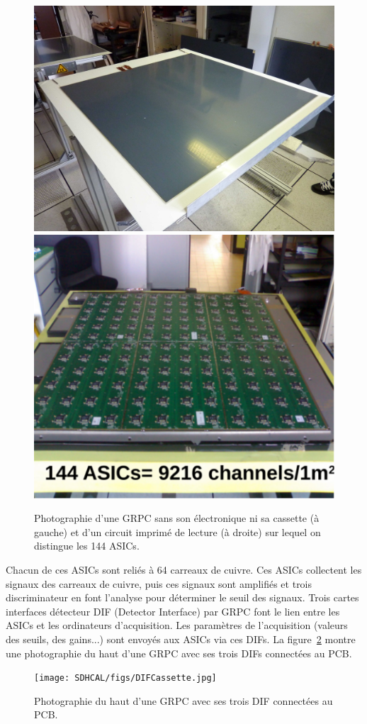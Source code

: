 \begin{figure}[!h]
  \begin{center}
    \includegraphics[width=.47\textwidth]{SDHCAL/figs/aLayer.jpg}
    \includegraphics[width=.4\textwidth]{SDHCAL/figs/layer_electronic2.pdf}
    \caption{Photographie d'une GRPC sans son électronique ni sa cassette (à gauche) et d'un circuit imprimé de lecture (à droite) sur lequel on distingue les 144 ASICs.}
    \label{fig:layer}
  \end{center}
\end{figure}
Chacun de ces ASICs sont reliés à 64 carreaux de cuivre. Ces ASICs collectent les signaux des carreaux de cuivre, puis ces signaux sont amplifiés et trois discriminateur en font l'analyse pour déterminer le seuil des signaux. Trois cartes interfaces détecteur DIF (Detector Interface) par GRPC font le lien entre les ASICs et les ordinateurs d'acquisition. Les paramètres de l'acquisition (valeurs des seuils, des gains...) sont envoyés aux ASICs via ces DIFs. La figure~\ref{fig:DIF} montre une photographie du haut d'une GRPC avec ses trois DIFs connectées au PCB.
\begin{figure}[!h]
  \begin{center}
    \texttt{[image: SDHCAL/figs/DIFCassette.jpg]}
    \caption{Photographie du haut d'une GRPC avec ses trois DIF connectées au PCB.}
    \label{fig:DIF}
  \end{center}
\end{figure}

